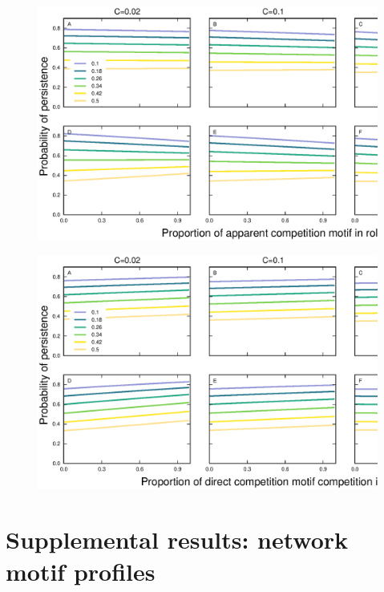 \documentclass[12pt]{article}
\begin{document}
\begin{spacing}{2.0}
    \begin{figure}[hb!]
        \centering
        \includegraphics[width=\textwidth]{figures/persistence_apparent_detailpers.eps}
        \caption{}
        \label{apparent_plus_SC}
        \end{figure}

    \begin{figure}[hb!]
        \centering
        \includegraphics[width=\textwidth]{figures/persistence_direct_detailpers.eps}
        \caption{}
        \label{direct_plus_SC}
        \end{figure}
    

\clearpage
                

\section{Supplemental results: network motif profiles}


\end{spacing}
\end{document}
